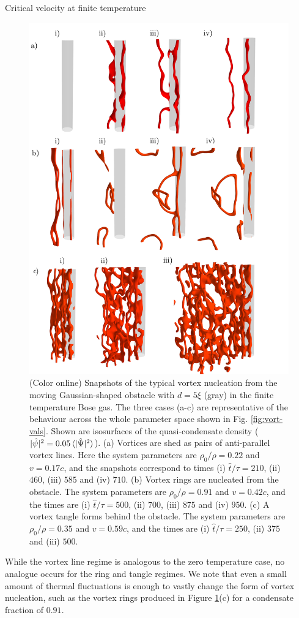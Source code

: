\begin{chapter}{\label{cha:nonequib}Critical velocity at finite temperature}
\begin{figure}
  \centering
    \includegraphics[width=0.6\linewidth]{nonequib/figures/vort}
    \caption{\label{fig:vort-lines}(Color online) Snapshots of the typical vortex nucleation from the moving Gaussian-shaped obstacle with $d=5\xi$ (gray) in the finite temperature Bose gas. The three cases (a-c) are representative of the behaviour across the whole parameter space shown in Fig. \ref{fig:vort-vals}. Shown are  isosurfaces of the quasi-condensate density ($|\hat{\psi}|^2 = 0.05\braket{|\hat{\Psi}|^2}$).  (a) Vortices are shed as pairs of anti-parallel vortex lines.  Here the system parameters are $\rho_0/\rho = 0.22$ and $v=0.17c$, and the snapshots correspond to times (i) $\hat{t}/\tau=210$, (ii) $460$, (iii) $585$ and (iv) $710$.  (b) Vortex rings are nucleated from the obstacle.  The system parameters are $\rho_0/\rho = 0.91$ and $v=0.42c$, and the times are (i) $\hat{t}/\tau=500$, (ii) $700$, (iii) $875$ and (iv) $950$. (c) A vortex tangle forms behind the obstacle. The system parameters are $\rho_0/\rho = 0.35$ and $v=0.59c$, and the times are (i) $\hat{t}/\tau=250$, (ii) $375$ and (iii) $500$. }
\end{figure}

While the vortex line regime is analogous to the zero temperature case, no analogue occurs for the ring and tangle regimes.   We note that even a small amount of thermal fluctuations is enough to vastly change the form of vortex nucleation, such as the vortex rings produced in Figure \ref{fig:vort-lines}(c) for a condensate fraction of $0.91$.


\end{chapter}
